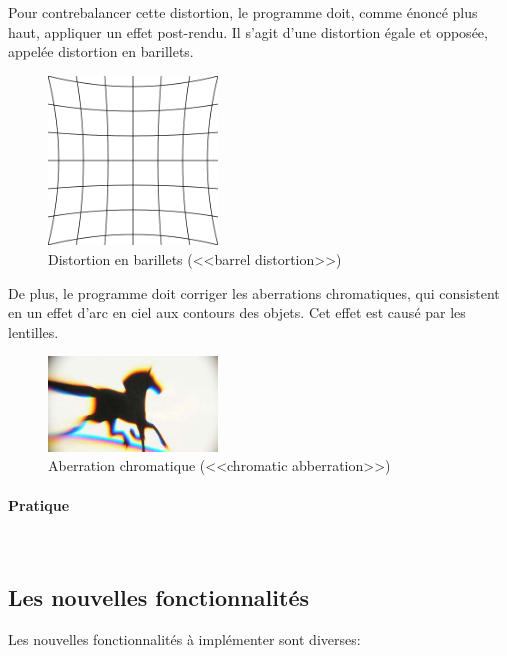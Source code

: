 \documentclass[a4paper,french,12pt]{article}
\begin{document}
			    Pour contrebalancer cette distortion, le programme doit, comme énoncé plus haut, appliquer
			    un effet post-rendu. Il s'agit d'une distortion égale et opposée, appelée distortion en 
			    barillets.
			    
			     \begin{figure}[h!]
			      \centering
				\includegraphics[width=0.4\textwidth]{pincushion_distortion.png}
			      \caption{Distortion en barillets (<<barrel distortion>>)}
			    \end{figure}
			    
			    De plus, le programme doit corriger les aberrations chromatiques, qui consistent en un effet
			    d'arc en ciel aux contours des objets. Cet effet est causé par les lentilles.
			    
			     \begin{figure}[h!]
			      \centering
				\includegraphics[width=0.4\textwidth]{chromatic_aberration.jpg}
			      \caption{Aberration chromatique (<<chromatic abberration>>)}
			    \end{figure}
			    
			    
			\paragraph{Pratique} ~\\

	\subsection{Les nouvelles fonctionnalités}
	
		Les nouvelles fonctionnalités à implémenter sont diverses:
		
\end{document}
